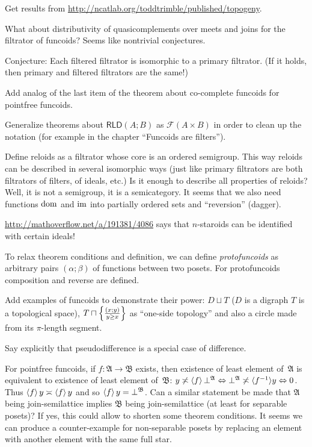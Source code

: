 \documentclass{amsart}
\begin{document}
Get results from \url{http://ncatlab.org/toddtrimble/published/topogeny}.

What about distributivity of quasicomplements over meets and joins for the filtrator of funcoids? Seems like nontrivial conjectures.

Conjecture: Each filtered filtrator is isomorphic to a primary filtrator. (If it holds, then primary and filtered filtrators are the same!)

Add analog of the last item of the theorem about co-complete funcoids for pointfree funcoids.

Generalize theorems about $\mathsf{RLD}(A;B)$ as $\mathscr{F}(A\times B)$ in order to clean up the notation
(for example in the chapter ``Funcoids are filters'').

Define reloids as a filtrator whose core is an ordered semigroup.
This way reloids can be described in several isomorphic ways (just like primary filtrators are both filtrators of filters, of ideals, etc.)
Is it enough to describe all properties of reloids? Well, it is not a semigroup, it is a semicategory.
It seems that we also need functions $\operatorname{dom}$ and $\operatorname{im}$ into partially ordered sets and ``reversion'' (dagger).

\url{http://mathoverflow.net/a/191381/4086} says that $n$-staroids can be identified with certain ideals!

To relax theorem conditions and definition, we can define \emph{protofuncoids} as arbitrary pairs $(\alpha;\beta)$ of functions
between two posets. For protofuncoids composition and reverse are defined.

Add examples of funcoids to demonstrate their power:
$D\sqcup T$ ($D$ is a digraph $T$ is a topological space),
$T\sqcap\left\{ \frac{(x;y)}{y\ge x}\right\}$ as ``one-side topology'' and also a circle made from its $\pi$-length segment.

Say explicitly that pseudodifference is a special case of difference.

For pointfree funcoids, if $f:\mathfrak{A}\rightarrow\mathfrak{B}$ exists,
then existence of least element of~$\mathfrak{A}$ is equivalent to existence of least element of~$\mathfrak{B}$:
$y \not\asymp \left\langle f\right\rangle \bot^{\mathfrak{A}} \Leftrightarrow
\bot^{\mathfrak{A}} \not\asymp \langle f^{- 1} \rangle y \Leftrightarrow 0$. Thus
$\left\langle f\right\rangle y \asymp \left\langle f\right\rangle y$ and so $\left\langle f\right\rangle y =
\bot^{\mathfrak{B}}$.
Can a similar statement be made that $\mathfrak{A}$ being join-semilattice implies $\mathfrak{B}$ being join-semilattice
(at least for separable posets)? If yes, this could allow to shorten some theorem conditions.
It seems we can produce a counter-example for non-separable posets by replacing an element with another element with the same full star.
\end{document}
